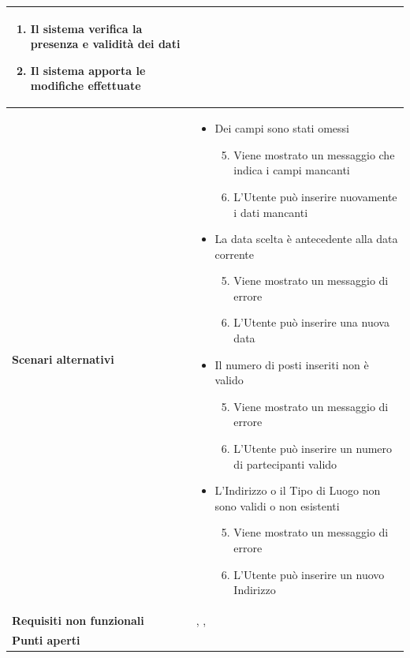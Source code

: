 \documentclass[12pt,a4paper]{report}
\let\oldhyperref\hyperref
\renewcommand{\hyperref}[2][]{\oldhyperref[#1]{\dotuline{#2}}}
\begin{document}
\begin{tabularx}{\textwidth}{|p{3.8cm}|X|}
\begin{enumerate}[nosep, leftmargin=*, before={\vspace{-0.5\baselineskip}}, after={\vspace{-0.8\baselineskip}}]
\begin{itemize}[nosep, leftmargin=*]
                \end{itemize}
            \item Il sistema verifica la presenza e validità dei dati
            \item Il sistema apporta le modifiche effettuate
        \end{enumerate} \\ \hline
    \textbf{Scenari alternativi} & 
        \begin{itemize}[nosep, leftmargin=*, before={\vspace{-0.5\baselineskip}}, after={\vspace{-0.8\baselineskip}}]
            \item Dei campi sono stati omessi
            \begin{enumerate}[nosep, leftmargin=*]
                \setcounter{enumi}{4}
                \item Viene mostrato un messaggio che indica i campi mancanti
                \item L'Utente può inserire nuovamente i dati mancanti
            \end{enumerate}
            \item La data scelta è antecedente alla data corrente
            \begin{enumerate}[nosep, leftmargin=*]
                \setcounter{enumi}{4}
                \item Viene mostrato un messaggio di errore
                \item L'Utente può inserire una nuova data
            \end{enumerate}
            \item Il numero di posti inseriti non è valido
            \begin{enumerate}[nosep, leftmargin=*]
                \setcounter{enumi}{4}
                \item Viene mostrato un messaggio di errore
                \item L'Utente può inserire un numero di partecipanti valido
            \end{enumerate}
            \item L'Indirizzo o il Tipo di Luogo non sono validi o non esistenti
            \begin{enumerate}[nosep, leftmargin=*]
                \setcounter{enumi}{4}
                \item Viene mostrato un messaggio di errore
                \item L'Utente può inserire un nuovo Indirizzo
            \end{enumerate}
        \end{itemize} \\ \hline
    \textbf{Requisiti non funzionali} & \hyperref[R04N]{R04N}, \hyperref[R05N]{R05N}, \hyperref[R07N]{R07N} \\ \hline
    \textbf{Punti aperti} & \\ \hline
\end{tabularx}
\end{document}
